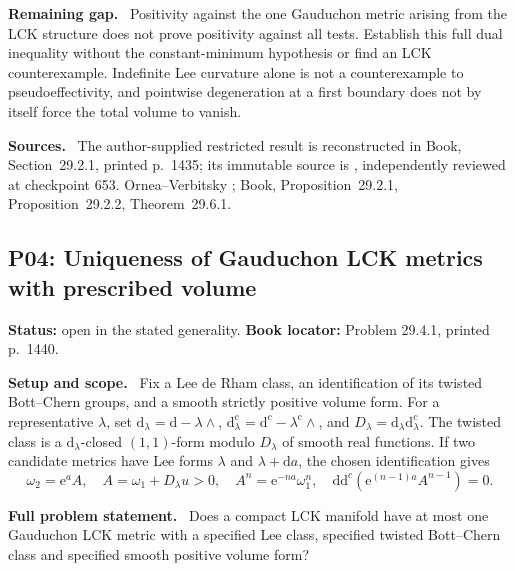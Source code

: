 \documentclass[11pt]{article}
\newcommand{\ddc}{\mathrm d\mathrm d^c}
\newcommand{\field}[1]{\par\medskip\noindent\textbf{#1.}\ }
\begin{document}
\field{Remaining gap} Positivity against the one Gauduchon metric arising from the LCK structure does not prove positivity against all tests. Establish this full dual inequality without the constant-minimum hypothesis or find an LCK counterexample. Indefinite Lee curvature alone is not a counterexample to pseudoeffectivity, and pointwise degeneration at a first boundary does not by itself force the total volume to vanish.
\field{Sources} The author-supplied restricted result is reconstructed in Book, Section~29.2.1, printed p.~1435; its immutable source is , independently reviewed at checkpoint 653. Ornea--Verbitsky \cite[arXiv version, Conjecture 4.14 and Remark 4.16]{OV25Balanced}; Book, Proposition~29.2.1, Proposition~29.2.2, Theorem~29.6.1.
\subsection{P04: Uniqueness of Gauduchon LCK metrics with prescribed volume}
\label{P04}
\noindent\textbf{Status:} open in the stated generality. \textbf{Book locator:} Problem 29.4.1, printed p.~1440.
\field{Setup and scope} Fix a Lee de Rham class, an identification of its twisted Bott--Chern groups, and a smooth strictly positive volume form. For a representative $\lambda$, set $\mathrm d_\lambda=\mathrm d-\lambda\wedge$, $\mathrm d^c_\lambda=\mathrm d^c-\lambda^{\mathrm c}\wedge$, and $D_\lambda=\mathrm d_\lambda\mathrm d^c_\lambda$. The twisted class is a $\mathrm d_\lambda$-closed $(1,1)$-form modulo $D_\lambda$ of smooth real functions. If two candidate metrics have Lee forms $\lambda$ and $\lambda+\mathrm da$, the chosen identification gives
\[\omega_2=\mathrm e^a A,\quad A=\omega_1+D_\lambda u>0,\quad
 A^n=\mathrm e^{-na}\omega_1^n,\quad
 \ddc(\mathrm e^{(n-1)a}A^{n-1})=0.\]
\field{Full problem statement} Does a compact LCK manifold have at most one Gauduchon LCK metric with a specified Lee class, specified twisted Bott--Chern class and specified smooth positive volume form?
\end{document}
